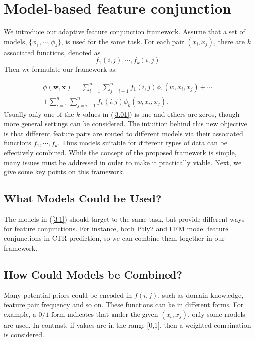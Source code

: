 \section{Model-based feature conjunction}
We introduce our adaptive feature conjunction framework. Assume that a set of models, $\{\phi_1,\cdots,\phi_k\}$, is used for the same task. For each pair $(x_i,x_j)$, there are $k$ associated functions, denoted as 
\begin{equation}
\label{3.01}
f_1(i,j),\cdots, f_k(i,j)
\end{equation} 
Then we formulate our framework as:

\begin{equation}
\begin{split}
\label{3.1}
\phi(\boldsymbol{w},\boldsymbol{x}) =\sum_{i=1}^n \sum_{j=i+1}^n f_1(i,j)\phi_1(w,x_i,x_j)+\cdots  \\
+\sum_{i=1}^n \sum_{j=i+1}^n f_k(i,j)\phi_k(w,x_i,x_j).
\end{split}
\end{equation}
Usually only one of the $k$ values in (\ref{3.01}) is one and others are zeros, though more general settings can be considered. The intuition behind this new objective is that different feature pairs are routed to different models via their associated functions $f_1,\cdots,f_k$. Thus models suitable for different types of data can be effectively combined. While the concept of the proposed framework is simple, many issues must be addressed in order to make it practically viable. Next, we give some key points on this framework.

\subsection{What Models Could be Used?}
The models in (\ref{3.1}) should target to the same task, but provide different ways for feature conjunctions. For instance, both Poly2 and FFM model feature conjunctions in CTR prediction, so we can combine them together in our framework.

\subsection{How Could Models be Combined?}
Many potential priors could be encoded in $f(i,j)$, such as domain knowledge, feature pair frequency and so on. These functions can be in different forms. For example, a $0/1$ form indicates that under the given $(x_i,x_j)$, only some models are used. In contrast, if values are in the range [0,1], then a weighted combination is considered.
